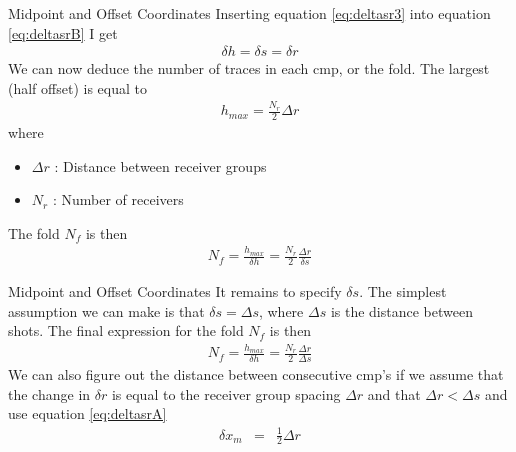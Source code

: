 \documentclass[xcolor=dvipsnames,notes]{beamer}
\begin{document}
\begin{frame}{Midpoint and Offset Coordinates}
Inserting equation \eqref{eq:deltasr3} into
equation \eqref{eq:deltasrB} I get
\begin{eqnarray}
\delta h = \delta s = \delta r
\label{eq:deltasr4}
\end{eqnarray}
We can now deduce the number of traces in each cmp, or the fold.
The largest (half offset) is equal to 
\begin{eqnarray}
h_{max}=\frac{N_r}{2} \Delta r
\end{eqnarray}
where
\begin{itemize}
\item $\Delta r$ : Distance between receiver groups
\item $N_r$ : Number of receivers
\end{itemize}
The fold $N_f$ is then
\begin{eqnarray}
 N_f = \frac{h_{max}}{\delta h} = \frac{N_r}{2} \frac{\Delta r}{\delta s}
\end{eqnarray}
\end{frame}
\begin{frame}{Midpoint and Offset Coordinates}
It remains to specify $\delta s$. 
The simplest assumption we can make is that $\delta s = \Delta s$,
where $\Delta s$ is the distance between shots.
The final expression for the fold $N_f$ is then
\begin{eqnarray}
 N_f = \frac{h_{max}}{\delta h} = \frac{N_r}{2} \frac{\Delta r}{\Delta s}
\end{eqnarray}
We can also figure out the distance between consecutive cmp's
if we assume that the change in $\delta r$ is equal to the receiver group spacing $\Delta r$
and that $\Delta r < \Delta s$ and use equation \eqref{eq:deltasrA}
\begin{eqnarray}
\delta x_m & = & \frac{1}{2}\Delta r
\label{eq:deltacmp}
\end{eqnarray}
\end{frame}
\end{document}
